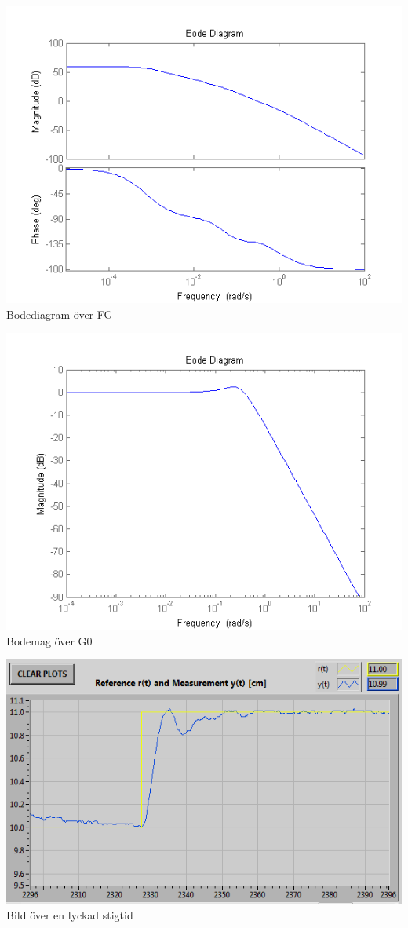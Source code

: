 \documentclass[a4paper]{article}
\begin{document}
\includegraphics{bodeFG}
Bodediagram över FG

\includegraphics{bodemagG}
Bodemag över G0

\includegraphics[scale=1]{lab2-the-best}
Bild över en lyckad stigtid
\end{document}
